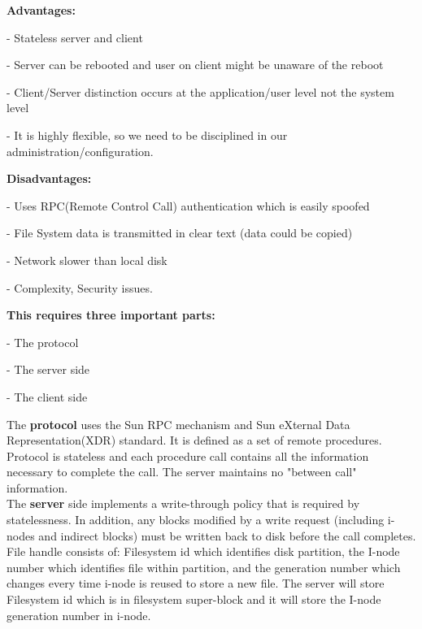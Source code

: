 \documentclass{article}
\begin{document}
\begin{itemize}
    \textbf{Advantages:} 

    
    \hspace{0.2in} - Stateless server and client


    \hspace{0.2in} - Server can be rebooted and user on client might be unaware of the reboot


    \hspace{0.2in} - Client/Server distinction occurs at the application/user level not the system level


    \hspace{0.2in} - It is highly flexible, so we need to be disciplined in our administration/configuration. 


    \textbf{Disadvantages:}

    \hspace{0.2in} - Uses RPC(Remote Control Call) authentication which is easily spoofed


    \hspace{0.2in} - File System data is transmitted in clear text (data could be copied)


    \hspace{0.2in} - Network slower than local disk


    \hspace{0.2in} - Complexity, Security issues.


    \textbf{This requires three important parts:}

    \hspace{0.2in} - The protocol

                     
    \hspace{0.2in} - The server side


    \hspace{0.2in} - The client side


    The \textbf{protocol} uses the Sun RPC mechanism and Sun eXternal Data Representation(XDR) standard. It is defined as a set of remote procedures. Protocol is stateless and each procedure call contains all the information necessary to complete the call. The server maintains no "between call" information. \\


    The \textbf{server} side implements a write-through policy that is required by statelessness. In addition, any blocks modified by a write request (including i-nodes and indirect blocks) must be written back to disk before the call completes. File handle consists of: Filesystem id which identifies disk partition, the I-node number which identifies file within partition, and the generation number which changes every time i-node is reused to store a new file. The server will store Filesystem id which is in filesystem super-block and it will store the I-node generation number in i-node. \\


\end{itemize}
\end{document}
